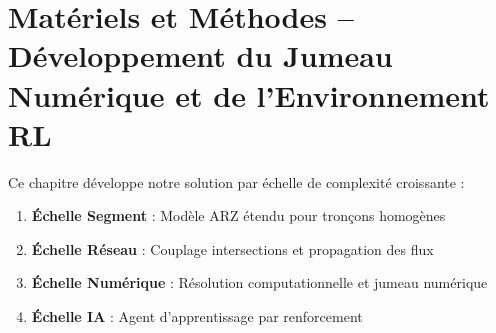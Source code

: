 \chapter{Matériels et Méthodes – Développement du Jumeau Numérique et de l'Environnement RL}
\label{chap:materiels_methodes}

\begin{progressionbox}
    Ce chapitre développe notre solution par échelle de complexité croissante :
    \begin{enumerate}
        \item \textbf{Échelle Segment} : Modèle ARZ étendu pour tronçons homogènes
        \item \textbf{Échelle Réseau} : Couplage intersections et propagation des flux
        \item \textbf{Échelle Numérique} : Résolution computationnelle et jumeau numérique
        \item \textbf{Échelle IA} : Agent d'apprentissage par renforcement
    \end{enumerate}
\end{progressionbox}





